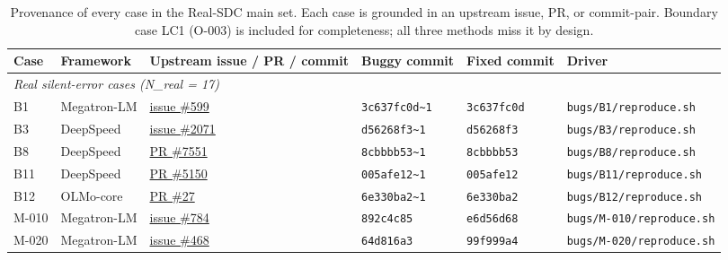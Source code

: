 \begin{table}[t]
\centering
\caption{Provenance of every case in the Real-SDC main set. Each case is grounded
in an upstream issue, PR, or commit-pair. Boundary case LC1 (O-003) is included
for completeness; all three methods miss it by design.}
\label{tab:provenance}
\small
\setlength{\tabcolsep}{3pt}
\renewcommand{\arraystretch}{1.05}
\begin{tabular}{@{}l l l l l l@{}}
\toprule
\textbf{Case} & \textbf{Framework} & \textbf{Upstream issue / PR / commit} & \textbf{Buggy commit} & \textbf{Fixed commit} & \textbf{Driver} \\
\midrule
\multicolumn{6}{l}{\textit{Real silent-error cases (N\_real = 17)}} \\
B1       & Megatron-LM & \href{https://github.com/NVIDIA/Megatron-LM/issues/599}{issue \#599}          & \texttt{3c637fc0d\textasciitilde 1}   & \texttt{3c637fc0d}     & \texttt{bugs/B1/reproduce.sh} \\
B3       & DeepSpeed   & \href{https://github.com/microsoft/DeepSpeed/issues/2071}{issue \#2071}      & \texttt{d56268f3\textasciitilde 1}    & \texttt{d56268f3}      & \texttt{bugs/B3/reproduce.sh} \\
B8       & DeepSpeed   & \href{https://github.com/deepspeedai/DeepSpeed/pull/7551}{PR \#7551}         & \texttt{8cbbbb53\textasciitilde 1}    & \texttt{8cbbbb53}      & \texttt{bugs/B8/reproduce.sh} \\
B11      & DeepSpeed   & \href{https://github.com/deepspeedai/DeepSpeed/pull/5150}{PR \#5150}         & \texttt{005afe12\textasciitilde 1}    & \texttt{005afe12}      & \texttt{bugs/B11/reproduce.sh} \\
B12      & OLMo-core   & \href{https://github.com/allenai/OLMo-core/pull/27}{PR \#27}                 & \texttt{6e330ba2\textasciitilde 1}    & \texttt{6e330ba2}      & \texttt{bugs/B12/reproduce.sh} \\
M-010    & Megatron-LM & \href{https://github.com/NVIDIA/Megatron-LM/issues/784}{issue \#784}         & \texttt{892c4c85}                     & \texttt{e6d56d68}      & \texttt{bugs/M-010/reproduce.sh} \\
M-020    & Megatron-LM & \href{https://github.com/NVIDIA/Megatron-LM/issues/468}{issue \#468}         & \texttt{64d816a3}                     & \texttt{99f999a4}      & \texttt{bugs/M-020/reproduce.sh} \\

\end{tabular}
\end{table}
